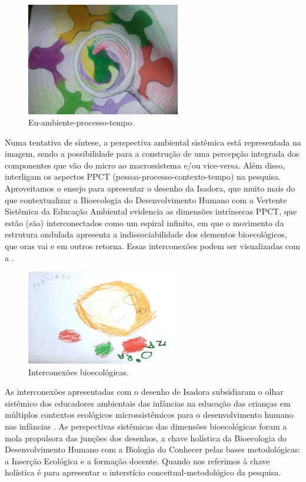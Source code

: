 \documentclass{textolivre}
\begin{document}
\begin{figure}[h!]
 \centering
 \includegraphics[width=0.6\textwidth]{figure05.png}
 \caption{Eu-ambiente-processo-tempo.}
 \label{fig-fig05}
\end{figure}


Numa tentativa de síntese, a perspectiva ambiental sistêmica está representada na imagem, sendo a possibilidade para a construção de uma percepção integrada dos componentes que vão do micro ao macrossistema e/ou vice-versa. Além disso, interligam os aspectos PPCT (pessoa-processo-contexto-tempo) na pesquisa. Aproveitamos o ensejo para apresentar o desenho da Isadora, que muito mais do que contextualizar a Bioecologia do Desenvolvimento Humano com a Vertente Sistêmica da Educação Ambiental evidencia as dimensões intrínsecas PPCT, que estão (são) interconectados como um espiral infinito, em que o movimento da estrutura ondulada apresenta a indissociabilidade dos elementos bioecológicos, que oras vai e em outros retorna. Essas interconexões podem ser visualizadas com a .

\begin{figure}[h!]
 \centering
 \includegraphics[width=0.6\textwidth]{figure06.png}
 \caption{Interconexões bioecológicas.}
 \label{fig-fig06}
\end{figure}

As interconexões apresentadas com o desenho de Isadora subsidiaram o olhar sistêmico dos educadores ambientais das infâncias na educação das crianças em múltiplos contextos ecológicos microssistêmicos para o desenvolvimento humano nas infâncias \cite{piske2019}. As perspectivas sistêmicas das dimensões bioecológicas foram a mola propulsora das junções dos desenhos, a chave holística da Bioecologia do Desenvolvimento Humano \cite{brofen2011} com a Biologia do Conhecer \cite{maturana2011} pelas bases metodológicas: a Inserção Ecológica e a formação docente. Quando nos referimos à chave holística é para apresentar o interstício conceitual-metodológico da pesquisa. 
\end{document}
